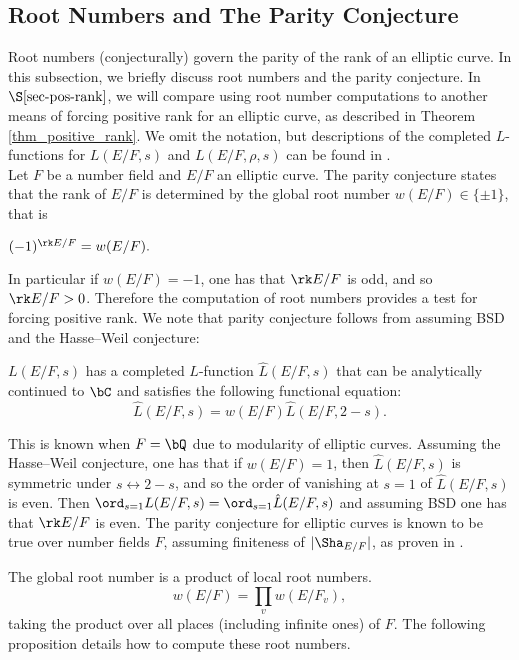 \subsection{Root Numbers and The Parity Conjecture}

Root numbers (conjecturally) govern the parity of the rank of an elliptic curve. In this subsection, we briefly discuss root numbers and the parity conjecture. In $\S\ref{sec-pos-rank}$, we will compare using root number computations to another means of forcing positive rank for an elliptic curve, as described in Theorem \ref{thm_positive_rank}. We omit the notation, but descriptions of the completed $L$-functions for $L(E / F, s)$ and $L(E / F, \rho, s)$ can be found in \cite[$\S$2.5]{DEW1}.\\


Let $F$ be a number field and $E / F$ an elliptic curve. The parity conjecture states that the rank of $E / F$ is determined by the global root number $w(E / F) \in \{ \pm 1 \}$, that is

\begin{conj}\label{parity}
    $(-1)^{\rk E / F} = w(E / F).$
\end{conj}

In particular if $w(E / F) = -1$, one has that $\rk E / F$ is odd, and so $\rk E / F > 0$. Therefore the computation of root numbers provides a test for forcing positive rank. We note that parity conjecture follows from assuming BSD and the Hasse--Weil conjecture: 

\begin{conj}
    $L(E / F, s)$ has a completed $L$-function 
    $\hat{L}(E / F, s)$ that can be analytically continued to $\bC$ and satisfies the following functional equation:
    \[ \hat{L}(E / F, s) = w(E / F) \hat{L}(E / F, 2- s) .\]
\end{conj}

This is known when $F = \bQ$ due to modularity of elliptic curves. Assuming the Hasse--Weil conjecture, one has that if $w(E / F) = 1$, then $\hat{L}(E / F, s)$ is symmetric under $s \leftrightarrow 2 - s$, and so the order of vanishing at $s = 1$ of $\hat{L}(E / F, s)$ is even. Then $\ord_{s = 1} L(E / F, s) = \ord_{s = 1}\hat{L}(E / F, s)$ and assuming BSD one has that $\rk E / F$ is even. 
The parity conjecture for elliptic curves is known to be true over number fields $F$, assuming finiteness of $|\Sha_{E / F}|$, as proven in \cite{TimVlad}.

The global root number is a product of local root numbers. 
\[ w(E / F) = \prod_v w(E / F_v), \]
taking the product over all places (including infinite ones) of $F$. 
The following proposition details how to compute these root numbers. 

